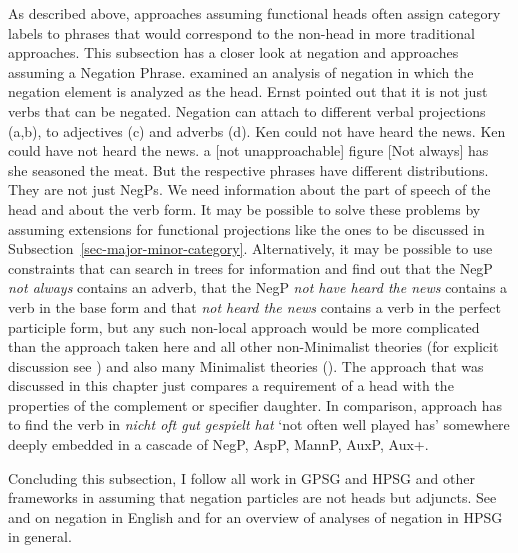 \largerpage
As described above, approaches assuming functional heads often assign category labels to phrases
that would correspond to the non-head in more traditional approaches. This subsection has a
closer look at negation and approaches assuming a Negation Phrase. \citet{Ernst92a} examined an analysis of
negation in which the negation element is analyzed as the head. Ernst pointed out that it is
not just verbs that can be negated. Negation can attach to different verbal projections (a,b), to adjectives (c)
and adverbs (d).
\eal
\ex Ken could not have heard the news.
\ex Ken could have not heard the news.
\ex a [not unapproachable] figure
\ex {}[Not always] has she seasoned the meat.
\zl
But the respective phrases have different distributions. They are not just NegPs. We need
information about the part of speech of the head and about the verb form. It may be possible to
solve these problems by assuming extensions for functional projections like the ones to be discussed in
Subsection~\ref{sec-major-minor-category}. Alternatively, it may be possible to use constraints that
can search in trees for information and find out that the NegP \emph{not always} contains an adverb,
that the NegP \emph{not have heard the news} contains a verb in the base form and that \emph{not
  heard the news} contains a verb in the perfect participle form, but any such non-local approach
would be more complicated than the approach taken here and all other non-Minimalist theories (for
explicit discussion see \citealt{Sag2007a}) and also many Minimalist theories (\eg \citealt[]{Abraham2005a}). The approach that was discussed in this chapter just compares a requirement
  of a head with the properties of the complement or specifier daughter. In comparison, 
  approach has to find the verb in \emph{nicht oft gut gespielt hat} `not often well played has'
  somewhere deeply embedded in a cascade of NegP, AspP, MannP, AuxP, Aux+. 

Concluding this subsection, I follow all work in GPSG and HPSG and other frameworks in assuming that
negation particles are not heads but adjuncts. See  and  on negation in English and
 for an overview of analyses of negation in HPSG in general.

